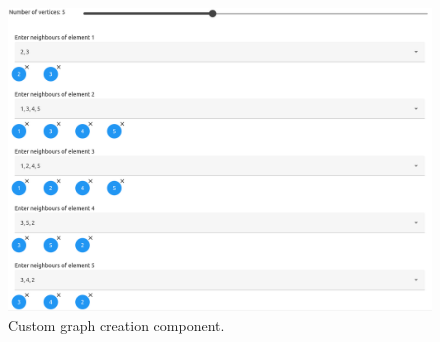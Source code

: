 \begin{figure}[H]
\begin{center}
\includegraphics[width=\textwidth,keepaspectratio]{images/website_custom_graph.png}
\end{center}
\caption{Custom graph creation component.}
\label{fig:website_custom_graph}
\end{figure}
